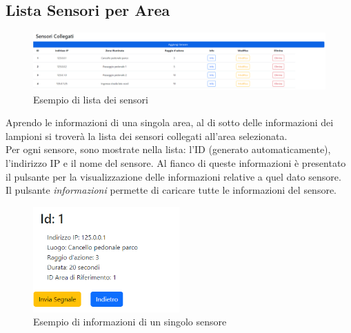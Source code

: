\documentclass[a4paper, 12pt]{article}
\begin{document}
\subsection{Lista Sensori per Area}
\begin{figure}[H]
    \centering
    \includegraphics[width=\textwidth]{ListaSensori}
    \caption{Esempio di lista dei sensori}
\end{figure}
Aprendo le informazioni di una singola area, al di sotto delle informazioni dei lampioni si troverà la lista dei sensori collegati all'area selezionata.\\
Per ogni sensore, sono mostrate nella lista: l'ID (generato automaticamente), l'indirizzo IP e il nome del sensore. Al fianco di queste informazioni è presentato il pulsante per la visualizzazione delle informazioni relative a quel dato sensore.\\
Il pulsante \textit{informazioni} permette di caricare tutte le informazioni del sensore.\\
\begin{figure}[H]
    \centering
    \includegraphics[width=0.5\textwidth]{InfoSensore}
    \caption{Esempio di informazioni di un singolo sensore}
\end{figure}
\end{document}
